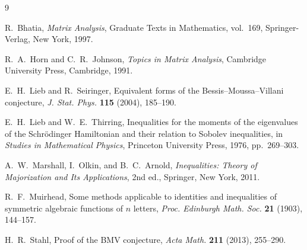 \documentclass[11pt,a4paper]{article}
\theoremstyle{definition}
\theoremstyle{remark}
\begin{document}
\begin{thebibliography}{9}

R.~Bhatia, \emph{Matrix Analysis}, Graduate Texts in Mathematics, vol.~169, Springer-Verlag, New York, 1997.

R.~A.~Horn and C.~R.~Johnson, \emph{Topics in Matrix Analysis}, Cambridge University Press, Cambridge, 1991.

E.~H.~Lieb and R.~Seiringer, Equivalent forms of the Bessis--Moussa--Villani conjecture, \emph{J. Stat. Phys.} \textbf{115} (2004), 185--190.

E.~H.~Lieb and W.~E.~Thirring, Inequalities for the moments of the eigenvalues of the Schr\"odinger Hamiltonian and their relation to Sobolev inequalities, in \emph{Studies in Mathematical Physics}, Princeton University Press, 1976, pp.~269--303.

A.~W.~Marshall, I.~Olkin, and B.~C.~Arnold, \emph{Inequalities: Theory of Majorization and Its Applications}, 2nd ed., Springer, New York, 2011.

R.~F.~Muirhead, Some methods applicable to identities and inequalities of symmetric algebraic functions of $n$ letters, \emph{Proc. Edinburgh Math. Soc.} \textbf{21} (1903), 144--157.

H.~R.~Stahl, Proof of the BMV conjecture, \emph{Acta Math.} \textbf{211} (2013), 255--290.

\end{thebibliography}
\end{document}
